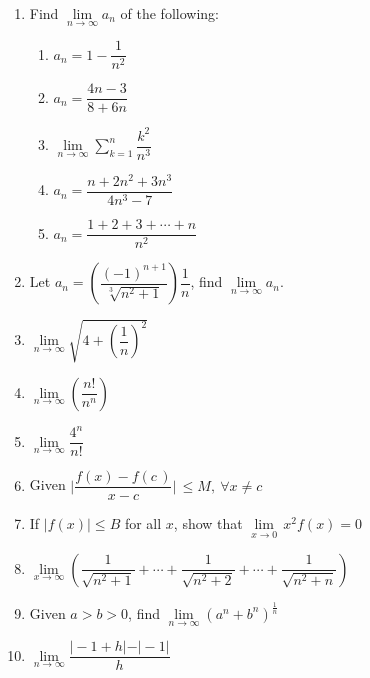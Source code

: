 \begin{multicols}{2}
\begin{enumerate}
        \item Find $\lim\limits_{n \to \infty}a_n$ of the following:
              \begin{enumerate}
                  \item $a_{n}=1-{\dfrac{1}{n^{2}}}$
                  \item $a_{n}={\dfrac{4n-3}{8+6n}}$
                  \item $\lim\limits_{n \to \infty}\sum\limits_{k=1}^{n}\dfrac{k^2}{n^3}$
                  \item $a_{n}=\dfrac{n+2n^{2}+3n^{3}}{4n^{3}-7}$
                  \item $a_{n}={\dfrac{1+2+3+\cdots+n}{n^{2}}}$
              \end{enumerate}
        \item Let $a_{n}={\left(\dfrac{{(-1)}^{n+1}}{\sqrt[3]{n^{2}+1}}\right)}\dfrac{1}{n}$,
              find $\lim\limits_{n \to \infty}a_n$.
        \item $\lim\limits_{n\to\infty}\sqrt{4+{\left({\dfrac{1}{n}}\right)}^{2}}$
        \item $\lim\limits_{n\to\infty}{\left(\dfrac{n!}{n^{n}}\right)}$
        \item $\lim\limits_{n\to\infty}{\dfrac{4^{n}}{n!}}$
        \item Given $\vert\dfrac{f(x)-f(c\,)}{x-c}\vert\,\leq M,\ \forall x\not=c$
        \item If $\vert f(x)\vert \le B$ for all $x$, show that
              $\lim\limits_{x\to0}\,x^{2}f(x)=0$
        \item $\lim\limits_{x\to\infty}\left(\dfrac{1}{\sqrt{n^{2}+1}}+\cdots+\dfrac{1}{\sqrt{n^{2}+2}}+\cdots+\dfrac{1}{\sqrt{n^{2}+n}}\right)$
        \item Given $a > b > 0$, find
              $\lim\limits_{n\to\infty}{\left(a^{n}+b^{n}\right)}^{\frac{1}{n}}$
        \item $\lim\limits_{n\to\infty}\dfrac{\vert-1+h\vert-\vert-1\vert}{h}$
    \end{enumerate}


\end{multicols}
